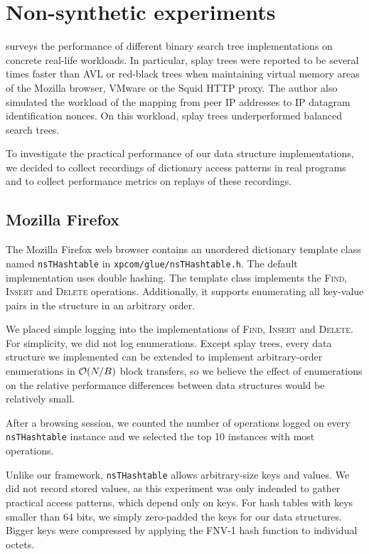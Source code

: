 \section{Non-synthetic experiments}
\cite{libavl} surveys the performance of different binary search tree
implementations on concrete real-life workloads. In particular, splay trees
were reported to be several times faster than AVL or red-black trees when
maintaining virtual memory areas of the Mozilla browser, VMware or the Squid
HTTP proxy. The author also simulated the workload of the mapping from peer
IP addresses to IP datagram identification nonces. On this workload, splay
trees underperformed balanced search trees.

To investigate the practical performance of our data structure implementations,
we decided to collect recordings of dictionary access patterns in real programs
and to collect performance metrics on replays of these recordings.

\subsection{Mozilla Firefox}
The Mozilla Firefox web browser contains an unordered dictionary template class
named \texttt{nsTHashtable} in \texttt{xpcom/glue/nsTHashtable.h}.
The default implementation uses double hashing. The template class implements
the \textsc{Find}, \textsc{Insert} and \textsc{Delete} operations. Additionally,
it supports enumerating all key-value pairs in the structure in an arbitrary
order.

We placed simple logging into the implementations of \textsc{Find},
\textsc{Insert} and \textsc{Delete}. For simplicity, we did not log
enumerations. Except splay trees, every data structure we implemented
can be extended to implement arbitrary-order enumerations in $\mathcal{O}(N/B)$ block
transfers, so we believe the effect of enumerations on the relative performance
differences between data structures would be relatively small.

After a browsing session, we counted the number of operations logged
on every \texttt{nsTHashtable} instance and we selected the top 10
instances with most operations.

Unlike our framework, \texttt{nsTHashtable} allows arbitrary-size keys and
values. We did not record stored values, as this experiment was only indended to
gather practical access patterns, which depend only on keys.
For hash tables with keys smaller than 64 bits, we simply zero-padded the keys
for our data structures. Bigger keys were compressed by applying the FNV-1
hash function to individual octets.


